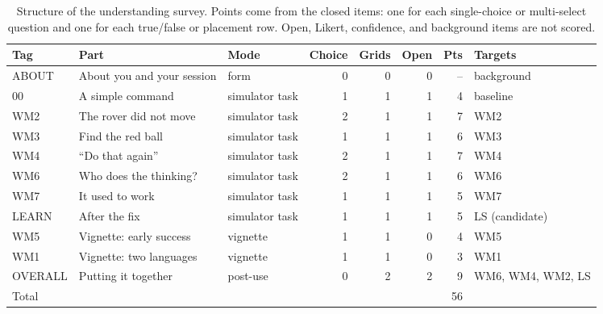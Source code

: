 \begin{table}[t]
\caption{Structure of the understanding survey. Points come from the closed items: one for each single-choice or multi-select question and one for each true/false or placement row. Open, Likert, confidence, and background items are not scored.}\label{tab:survey-structure}
\small
\begin{tabular}{lp{3.6cm}p{1.8cm}rrrrp{2.2cm}}
\toprule
Tag & Part & Mode & Choice & Grids & Open & Pts & Targets\\
\midrule
ABOUT & About you and your session & form & 0 & 0 & 0 & -- & background\\
00 & A simple command & simulator task & 1 & 1 & 1 & 4 & baseline\\
WM2 & The rover did not move & simulator task & 2 & 1 & 1 & 7 & WM2\\
WM3 & Find the red ball & simulator task & 1 & 1 & 1 & 6 & WM3\\
WM4 & ``Do that again'' & simulator task & 2 & 1 & 1 & 7 & WM4\\
WM6 & Who does the thinking? & simulator task & 2 & 1 & 1 & 6 & WM6\\
WM7 & It used to work & simulator task & 1 & 1 & 1 & 5 & WM7\\
LEARN & After the fix & simulator task & 1 & 1 & 1 & 5 & LS (candidate)\\
WM5 & Vignette: early success & vignette & 1 & 1 & 0 & 4 & WM5\\
WM1 & Vignette: two languages & vignette & 1 & 1 & 0 & 3 & WM1\\
OVERALL & Putting it together & post-use & 0 & 2 & 2 & 9 & WM6, WM4, WM2, LS\\
\midrule Total & & & & & & 56 &\\
\bottomrule
\end{tabular}
\par{}
\end{table}
